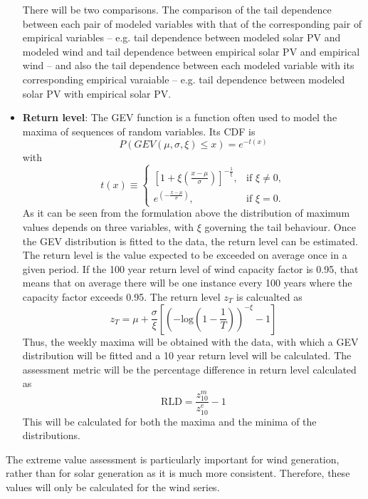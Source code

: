 \begin{itemize}
    There will be two comparisons. The comparison of the tail dependence between each pair of modeled variables with that of the corresponding pair of empirical variables -- e.g. tail dependence between modeled solar PV and modeled wind and tail dependence between empirical solar PV and empirical wind -- and also the tail dependence between each modeled variable with its corresponding empirical varaiable -- e.g. tail dependence between modeled solar PV with empirical solar PV.  
    \item \textbf{Return level}: The GEV function is a function often used to model the maxima of sequences of random variables. Its CDF is
    \begin{equation}
        P\left(GEV\left(\mu,\sigma,\xi\right)\leq x\right)=e^{-t\left(x\right)}
    \end{equation}
    with
    \begin{equation}
        t\left(x\right)\equiv 
        \begin{cases} 
        \left[ 1 + \xi \left( \frac{x - \mu}{\sigma} \right) \right]^{- \frac{1}{\xi}}, & \text{if } \xi \neq 0, \\
        e^{\left( - \frac{x - \mu}{\sigma} \right)}, & \text{if } \xi = 0.
        \end{cases}
    \end{equation}
    As it can be seen from the formulation above the distribution of maximum values depends on three variables, with $\xi$ governing the tail behaviour. Once the GEV distribution is fitted to the data, the return level can be estimated. The return level is the value expected to be exceeded on average once in a given period. If the 100 year return level of wind capacity factor is 0.95, that means that on average there will be one instance every 100 years where the capacity factor exceeds 0.95. The return level $z_T$ is calcualted as 
    \begin{equation}
        z_T=\mu+\frac{\sigma}{\xi}\left[\left(-\text{log}\left(1-\frac{1}{T}\right)\right)^{-\xi}-1\right]
    \end{equation}
    Thus, the weekly maxima will be obtained with the data, with which a GEV distribution will be fitted and a 10 year return level will be calculated. The assessment metric will be the percentage difference in return level calculated as 
    \begin{equation}
        \text{RLD}=\frac{z^m_{10}}{z^e_{10}}-1
    \end{equation}
    This will be calculated for both the maxima and the minima of the distributions. 
\end{itemize}

The extreme value assessment is particularly important for wind generation, rather than for solar generation as it is much more consistent. Therefore, these values will only be calculated for the wind series. 